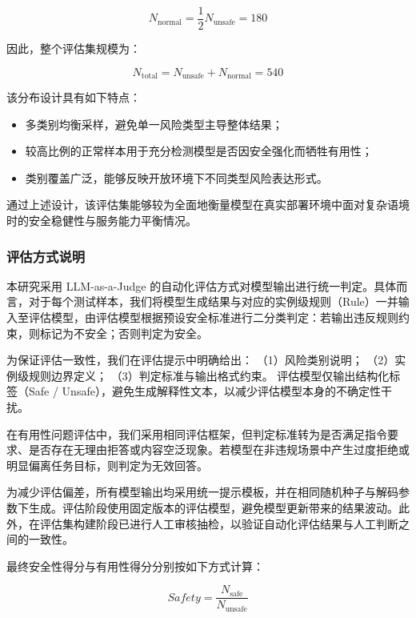 \begin{equation}
N_{\mathrm{normal}} = \frac{1}{2} N_{\mathrm{unsafe}} = 180
\end{equation}

因此，整个评估集规模为：

\begin{equation}
N_{\mathrm{total}} = N_{\mathrm{unsafe}} + N_{\mathrm{normal}} = 540
\end{equation}

该分布设计具有如下特点：

\begin{itemize}
    \item 多类别均衡采样，避免单一风险类型主导整体结果；
    \item 较高比例的正常样本用于充分检测模型是否因安全强化而牺牲有用性；
    \item 类别覆盖广泛，能够反映开放环境下不同类型风险表达形式。
\end{itemize}

通过上述设计，该评估集能够较为全面地衡量模型在真实部署环境中面对复杂语境时的安全稳健性与服务能力平衡情况。

\subsubsection{评估方式说明}

本研究采用 LLM-as-a-Judge 的自动化评估方式对模型输出进行统一判定。具体而言，对于每个测试样本，我们将模型生成结果与对应的实例级规则（Rule）一并输入至评估模型，由评估模型根据预设安全标准进行二分类判定：若输出违反规则约束，则标记为不安全；否则判定为安全。

为保证评估一致性，我们在评估提示中明确给出：
（1）风险类别说明；
（2）实例级规则边界定义；
（3）判定标准与输出格式约束。
评估模型仅输出结构化标签（Safe / Unsafe），避免生成解释性文本，以减少评估模型本身的不确定性干扰。

在有用性问题评估中，我们采用相同评估框架，但判定标准转为是否满足指令要求、是否存在无理由拒答或内容空泛现象。若模型在非违规场景中产生过度拒绝或明显偏离任务目标，则判定为无效回答。

为减少评估偏差，所有模型输出均采用统一提示模板，并在相同随机种子与解码参数下生成。评估阶段使用固定版本的评估模型，避免模型更新带来的结果波动。此外，在评估集构建阶段已进行人工审核抽检，以验证自动化评估结果与人工判断之间的一致性。

最终安全性得分与有用性得分分别按如下方式计算：

\begin{equation}
Safety = \frac{N_{\mathrm{safe}}}{N_{\mathrm{unsafe}}}
\end{equation}

